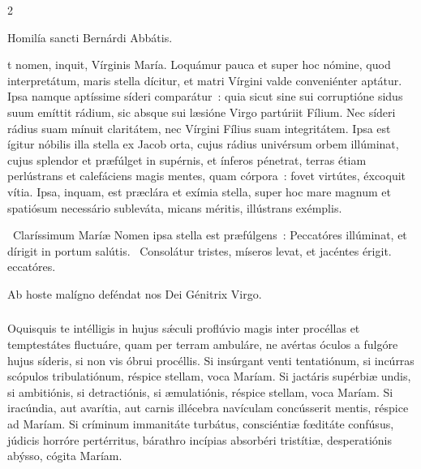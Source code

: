 \documentclass[9pt,twoside]{extarticle}
\begin{document}
\begin{multicols}{2}
\begin{center}Homilía sancti Bernárdi Abbátis.\\
\end{center}
t nomen, inquit, Vírginis María. Loquámur pauca et super hoc nómine, quod interpretátum, maris stella dícitur, et matri Vírgini valde conveniénter aptátur. Ipsa namque aptíssime síderi comparátur~: quia sicut sine sui corruptióne sidus suum emíttit rádium, sic absque sui læsióne Virgo partúriit Fílium. Nec síderi rádius suam mínuit claritátem, nec Vírgini Fílius suam integritátem. Ipsa est ígitur nóbilis illa stella ex Jacob orta, cujus rádius univérsum orbem illúminat, cujus splendor et præfúlget in supérnis, et ínferos pénetrat, terras étiam perlústrans et calefáciens magis mentes, quam córpora~: fovet virtútes, éxcoquit vítia. Ipsa, inquam, est præclára et exímia stella, super hoc mare magnum et spatiósum necessário subleváta, micans méritis, illústrans exémplis.

\begin{tightlist}{}
\item {}~Claríssimum Maríæ Nomen ipsa stella est præfúlgens~: \textred{*} Peccatóres illúminat, et dírigit in portum salútis. ~Consolátur tristes, míseros levat, et jacéntes érigit. eccatóres.
\item {\small {} Ab hoste malígno deféndat nos Dei Génitrix Virgo.}
\end{tightlist}

\subsubsection*{\center {}}
\lettrine{O} quisquis te intélligis in hujus sǽculi proflúvio magis inter procéllas et temptestátes fluctuáre, quam per terram ambuláre, ne avértas óculos a fulgóre hujus síderis, si non vis óbrui procéllis. Si insúrgant venti tentatiónum, si incúrras scópulos tribulatiónum, réspice stellam, voca Maríam. Si jactáris supérbiæ undis, si ambitiónis, si detractiónis, si æmulatiónis, réspice stellam, voca Maríam. Si iracúndia, aut avarítia, aut carnis illécebra navículam concússerit mentis, réspice ad Maríam. Si críminum immanitáte turbátus, consciéntiæ fœditáte confúsus, júdicis horróre pertérritus, bárathro incípias absorbéri tristítiæ, desperatiónis abýsso, cógita Maríam.


\end{multicols}
\end{document}
